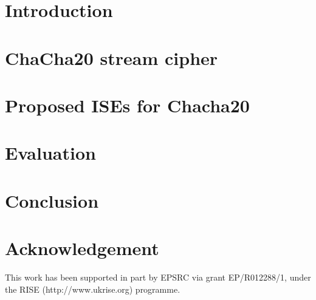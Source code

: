 \documentclass[conference]{IEEEtran}
\begin{document}


\section{Introduction}
\label{sec:intro}


\section{ChaCha20 stream cipher}
\label{sec:bg}


\section{Proposed ISEs for Chacha20}
\label{sec:ise}


\section{Evaluation}
\label{sec:res}


\section{Conclusion}
\label{sec:outro}


\section*{Acknowledgement}
	This work has been supported in part by EPSRC via grant EP/R012288/1,
	under the RISE (http://www.ukrise.org) programme.



%
%
%




%
\end{document}
